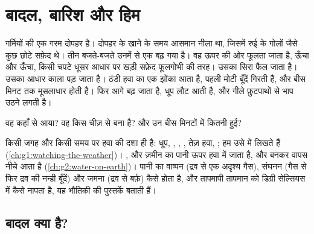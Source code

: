 \chapter{बादल, बारिश और हिम}\label{ch:g4:clouds-rain-snow}

गर्मियों की एक गरम दोपहर है। दोपहर के खाने के समय आसमान नीला था, जिसमें
रुई के गोलों जैसे कुछ छोटे सफ़ेद  थे। तीन बजते-बजते उनमें से एक बढ़ गया
है। वह ऊपर की ओर फूलता जाता है, ऊँचा और ऊँचा, किसी चपटे धूसर आधार पर खड़ी
सफ़ेद फूलगोभी की तरह। उसका सिरा फैल जाता है। उसका आधार काला पड़ जाता है।
ठंडी हवा का एक झोंका आता है, पहली मोटी बूँदें गिरती हैं, और बीस मिनट तक
मूसलाधार  होती है। फिर  आगे बढ़ जाता है, धूप लौट आती है, और गीले
फ़ुटपाथों से भाप उठने लगती है।

वह  कहाँ से आया? वह किस चीज़ से बना है? और उन बीस मिनटों में कितनी
 हुई?

\begin{recall}
किसी जगह और किसी समय पर हवा की दशा ही  है: धूप, , , , तेज़
हवा, ; हम उसे  में लिखते हैं (\cref{ch:g1:watching-the-weather})।
,  और ज़मीन का पानी ऊपर हवा में जाता है, और  बनकर वापस
नीचे आता है (\cref{ch:g2:water-on-earth})। पानी का वाष्पन (द्रव से एक अदृश्य
गैस), संघनन (गैस से फिर द्रव की नन्ही बूँदें) और जमना (द्रव से बर्फ़) कैसे
होता है, और तापमापी तापमान को डिग्री सेल्सियस में कैसे नापता है, यह भौतिकी की
पुस्तकें बताती हैं।
\end{recall}

\section{बादल क्या है?}

